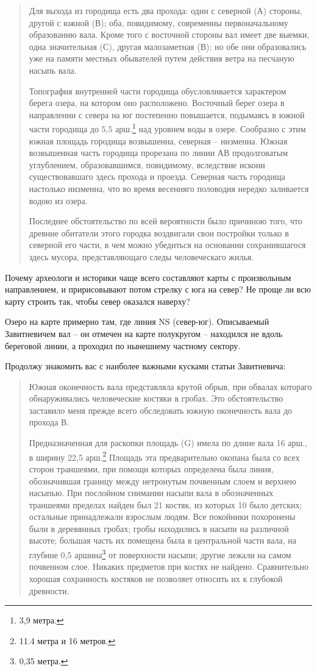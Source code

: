 \begin{quotation}
Для выхода из городища есть два прохода: один с северной (А) стороны, другой с южной (В); оба, повидимому, современны первоначальному образованию вала. Кроме того с восточной стороны вал имеет две выемки, одна значительная (С), другая малозаметная (В); но обе они образовались уже на памяти местных обывателей путем действия ветра на песчаную насыпь вала. 

Топография внутренней части городища обусловливается характером берега озера, на котором оно расположено. Восточный берег озера в направлении с севера на юг постепенно повышается, подымаясь в южной части городища до 5,5 арш.\footnote{3,9 метра.} над уровнем воды в озере. Сообразно с этим южная площадь городища возвышенна, северная – низменна. Южная возвышенная часть городища прорезана по линии АВ продолговатым углублением, образовавшимся, повидимому, вследствие искони существовавшаго здесь прохода и проезда. Северная часть городища настолько низменна, что во время весенняго половодия нередко заливается водою из озера.

Последнее обстоятельство по всей вероятности было причиною того, что древние обитатели этого городка воздвигали свои постройки только в северной его части, в чем можно убедиться на основании сохранившагося здесь мусора, представляющаго следы человеческаго жилья.
\end{quotation}

Почему археологи и историки чаще всего составляют карты с произвольным направлением, и пририсовывают потом стрелку с юга на север? Не проще ли всю карту строить так, чтобы север оказался наверху?

Озеро на карте примерно там, где линия NS (север-юг). Описываемый Завитневичем вал – он отмечен на карте полукругом – находился не вдоль береговой линии, а проходил по нынешнему частному сектору.

Продолжу знакомить вас с наиболее важными кусками статьи Завитневича:

\begin{quotation}
Южная оконечность вала представляла крутой обрыв, при обвалах котораго обнаруживались человеческие костяки в гробах. Это обстоятельство заставило меня прежде всего обследовать южную оконечность вала до прохода В.

Предназначенная для раскопки площадь (G) имела по длине вала 16 арш., в ширину 22,5 арш.\footnote{11.4 метра и 16 метров.} Площадь эта предварительно окопана была со всех сторон траншеями, при помощи которых определена была линия, обозначившая границу между нетронутым почвенным слоем и верхнею насыпью. При послойном снимании насыпи вала в обозначенных траншеями пределах найден был 21 костяк, из которых 10 было детских; остальные принадлежали взрослым людям. Все покойники похоронены были в деревянных гробах; гробы находились в насыпи на различной высоте; большая часть их помещена была в центральной части вала, на глубине 0,5 аршина\footnote{0,35 метра.} от поверхности насыпи; другие лежали на самом почвенном слое. Никаких предметов при костях не найдено. Сравнительно хорошая сохранность костяков не позволяет относить их к глубокой древности.
\end{quotation}

